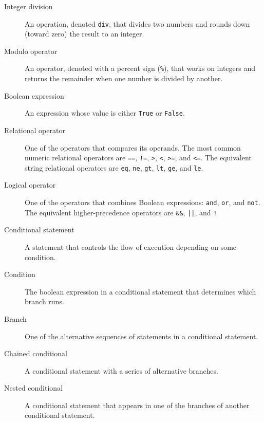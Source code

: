 \begin{description}

\item[Integer division] An operation, denoted {\tt div}, 
that divides two numbers and rounds down (toward zero) the 
result to an integer.

\item[Modulo operator]  An operator, denoted with a percent sign
({\tt \%}), that works on integers and returns the remainder when one
number is divided by another.

\item[Boolean expression]  An expression whose value is either 
{\tt True} or {\tt False}.

\item[Relational operator] One of the operators that compares
its operands. The most common numeric relational operators are 
{\tt ==}, {\tt !=}, {\tt >}, {\tt <}, {\tt >=}, and {\tt <=}. 
The equivalent string relational operators are {\tt eq}, {\tt ne}, 
{\tt gt}, {\tt lt}, {\tt ge}, and {\tt le}.

\item[Logical operator] One of the operators that combines Boolean
expressions: {\tt and}, {\tt or}, and {\tt not}. The equivalent 
higher-precedence operators are {\tt \&\&}, {\tt ||}, and {\tt !}

\item[Conditional statement]  A statement that controls the 
flow of execution depending on some condition.

\item[Condition] The boolean expression in a conditional 
statement that determines which branch runs.

\item[Branch] One of the alternative sequences of statements in
a conditional statement.

\item[Chained conditional]  A conditional statement with a 
series of alternative branches.

\item[Nested conditional]  A conditional statement that appears
in one of the branches of another conditional statement.


\end{description}
